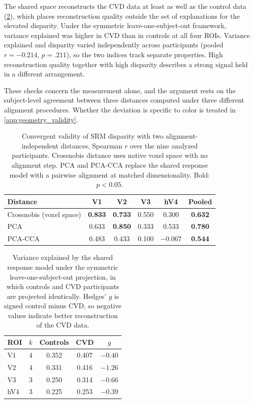 The shared space reconstructs the CVD data at least as well as the control data (\cref{tab:variance_explained}), which places reconstruction quality outside the set of explanations for the elevated disparity. Under the symmetric leave-one-subject-out framework, variance explained was higher in CVD than in controls at all four ROIs. Variance explained and disparity varied independently across participants (pooled $r = -0.214$, $p = .211$), so the two indices track separate properties. High reconstruction quality together with high disparity describes a strong signal held in a different arrangement.

These checks concern the measurement alone, and the argument rests on the subject-level agreement between three distances computed under three different alignment procedures. Whether the deviation is specific to color is treated in \cref{app:geometry_validity}.

\begin{table}[h]
\centering
\caption{Convergent validity of SRM disparity with two alignment-independent distances, Spearman $r$ over the nine analyzed participants. Crossnobis distance uses native voxel space with no alignment step. PCA and PCA-CCA replace the shared response model with a pairwise alignment at matched dimensionality. Bold: $p < 0.05$.}
\label{tab:triangulation}
\begin{tabular}{lccccc}
\toprule
Distance & V1 & V2 & V3 & hV4 & Pooled \\
\midrule
Crossnobis (voxel space) & \textbf{0.833} & \textbf{0.733} & 0.550 & 0.300 & \textbf{0.632} \\
PCA                      & 0.633 & \textbf{0.850} & 0.333 & 0.533 & \textbf{0.780} \\
PCA-CCA                  & 0.483 & 0.433 & 0.100 & $-0.067$ & \textbf{0.544} \\
\bottomrule
\end{tabular}
\end{table}

\begin{table}[h]
\centering
\caption{Variance explained by the shared response model under the symmetric leave-one-subject-out projection, in which controls and CVD participants are projected identically. Hedges' $g$ is signed control minus CVD, so negative values indicate better reconstruction of the CVD data.}
\label{tab:variance_explained}
\begin{tabular}{lcccc}
\toprule
ROI & $k$ & Controls & CVD & $g$ \\
\midrule
V1  & 4 & 0.352 & 0.407 & $-0.40$ \\
V2  & 4 & 0.331 & 0.416 & $-1.26$ \\
V3  & 3 & 0.250 & 0.314 & $-0.66$ \\
hV4 & 3 & 0.225 & 0.253 & $-0.39$ \\
\bottomrule
\end{tabular}
\end{table}

